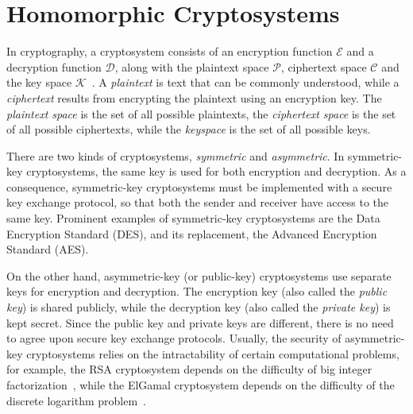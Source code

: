 \section{Homomorphic Cryptosystems}

In cryptography, a cryptosystem consists of an encryption function $\mathcal{E}$ and a decryption function $\mathcal{D}$, along with the plaintext space $\mathcal{P}$, ciphertext space $\mathcal{C}$ and the key space $\mathcal{K}$~\cite{bauer_cryptosystem_2005}. A \textit{plaintext} is text that can be commonly understood, while a \textit{ciphertext} results from encrypting the plaintext using an encryption key. The \textit{plaintext space} is the set of all possible plaintexts, the \textit{ciphertext space} is the set of all possible ciphertexts, while the \textit{keyspace} is the set of all possible keys.

There are two kinds of cryptosystems, \textit{symmetric} and \textit{asymmetric}. In symmetric-key cryptosystems, the same key is used for both encryption and decryption. As a consequence, symmetric-key cryptosystems must be implemented with a secure key exchange protocol, so that both the sender and receiver have access to the same key. Prominent examples of symmetric-key cryptosystems are the Data Encryption Standard (DES), and its replacement, the Advanced Encryption Standard (AES).

On the other hand, asymmetric-key (or public-key) cryptosystems use separate keys for encryption and decryption. The encryption key (also called the \textit{public key}) is shared publicly, while the decryption key (also called the \textit{private key}) is kept secret. Since the public key and private keys are different, there is no need to agree upon secure key exchange protocols. Usually, the security of asymmetric-key cryptosystems relies on the intractability of certain computational problems, for example, the RSA cryptosystem depends on the difficulty of big integer factorization~\cite{rivest_method_1978}, while the ElGamal cryptosystem depends on the difficulty of the discrete logarithm problem~\cite{blakley_public_1985}.

